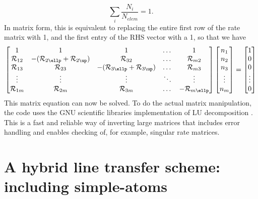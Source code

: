%
\begin{equation}
\sum_i \frac{N_i}{N_{elem}} = 1.
\end{equation}
In matrix form, this is equivalent to replacing the entire first row
of the rate matrix with 1, and the first entry of the RHS vector with a 1,
so that we have
%
\begin{equation}
\begin{bmatrix}
    1  & 1 & 1 & \dots & 1\\
    {\cal R}_{12} & -({\cal R}_{2\ellp} + {\cal R}_{2\up}) & {\cal R}_{32} & \dots & {\cal R}_{m2} \\
    {\cal R}_{13}  & {\cal R}_{23} & -({\cal R}_{3\ellp} + {\cal R}_{3\up}) & \dots & {\cal R}_{m3} \\
    \vdots & \vdots & \vdots & \ddots & \vdots \\
    {\cal R}_{1m}      & {\cal R}_{2m} & {\cal R}_{3m} & \dots & -{\cal R}_{m\ellp}
\end{bmatrix}
\begin{bmatrix}
    n_1 \\
    n_2 \\
    n_3 \\
    \vdots \\
    n_m
\end{bmatrix}
=
\begin{bmatrix}
    1 \\
    0 \\
    0 \\
    \vdots \\
    0
\end{bmatrix}
\end{equation}
%
This matrix equation can now be solved.
To do the actual matrix manipulation, the code uses the GNU 
scientific libraries \citep[GSL;][]{GSL} implementation of
LU decomposition \citep{turing}. This is a fast and reliable way of
inverting large matrices that includes error handling and enables
checking of, for example, singular rate matrices.















\section{A hybrid line transfer scheme: including simple-atoms}

